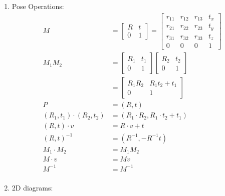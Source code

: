 \documentclass{article}
\begin{document}
\begin{enumerate}
    \item Pose Operations:
    \begin{align*}
        M &= \begin{bmatrix}
            R & t \\ 0 & 1
        \end{bmatrix} = \begin{bmatrix}
            r_{11} & r_{12} & r_{13} & t_x \\ r_{21} & r_{22} & r_{23} & t_y \\ r_{31} & r_{32} & r_{33} & t_z \\ 0 & 0 & 0 & 1
        \end{bmatrix} \\
        M_1 M_2 &= \begin{bmatrix}
            R_1 & t_1 \\ 0 & 1
        \end{bmatrix} \begin{bmatrix}
            R_2 & t_2 \\ 0 & 1
        \end{bmatrix} \\
        &= \begin{bmatrix}
            R_1 R_2 & R_1 t_2 + t_1 \\ 0 & 1
        \end{bmatrix} \\
        P &= (R, t) \\
        (R_1, t_1) \cdot (R_2, t_2) &= (R_1 \cdot R_2, R_1 \cdot t_2 + t_1) \\
        (R, t) \cdot v &= R \cdot v + t \\
        (R, t)^{-1} &= (R^{-1}, -R^{-1}t) \\
        M_1 \cdot M_2 &= M_1 M_2 \\
        M \cdot v &= M v \\
        M^{-1} &= M^{-1} \\
    \end{align*}

    \item 2D diagrams:


\end{enumerate}
\end{document}
